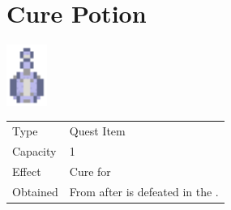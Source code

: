 \section{Cure Potion}
\label{item:cure_potion_uniq}

\includegraphics[height=2cm,keepaspectratio]{./resources/items/elixir}

\begin{longtable}{ l p{9cm} }
	Type
	& Quest Item
\\ %
	Capacity
	& 1
\\ %
	Effect
	& Cure for \nameref{char:kaeli}
\\ %
	Obtained
	& From \nameref{char:tristam} after \nameref{monster:flamerus_rex} is defeated in the \nameref{map:bone_dungeon}.
\end{longtable}
